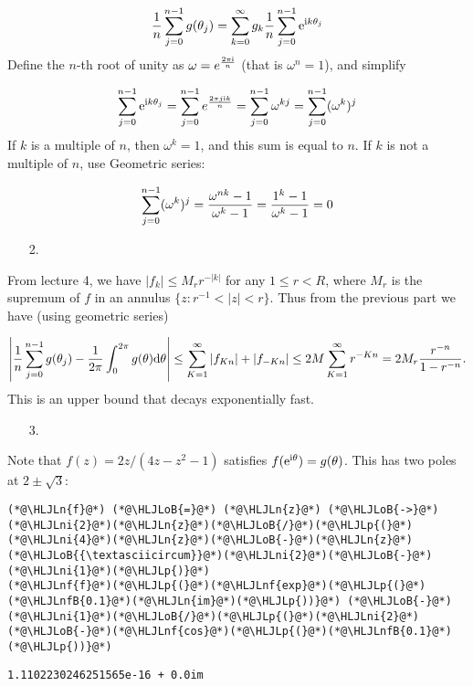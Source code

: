 \documentclass[12pt,a4paper]{article}
\newcommand{\HLJLn}[1]{#1}
\newcommand{\HLJLnf}[1]{\textcolor[RGB]{66,102,213}{#1}}
\newcommand{\HLJLnfB}[1]{\textcolor[RGB]{59,151,46}{#1}}
\newcommand{\HLJLni}[1]{\textcolor[RGB]{59,151,46}{#1}}
\newcommand{\HLJLoB}[1]{\textcolor[RGB]{102,102,102}{\textbf{#1}}}
\newcommand{\HLJLp}[1]{#1}
\def\D{ {\rm d} }
\def\I{ {\rm i} }
\def\E{ {\rm e} }
\begin{document}
\[
{1 \over n} \sum_{j=0}^{n-1} g(\theta_j) = \sum_{k=0}^\infty g_k  {1 \over n} \sum_{j=0}^{n-1} \E^{\I k \theta_j}
\]
Define the $n$-th root of unity as $\omega = e^{2 \pi \I  \over n}$ (that is $\omega^n = 1$), and simplify

\[
\sum_{j=0}^{n-1} \E^{\I k \theta_j} =\sum_{j=0}^{n-1} e^{{2 \pi j \I k \over n}} =\sum_{j=0}^{n-1} \omega^{kj}= \sum_{j=0}^{n-1} (\omega^k)^j
\]
If $k$ is a multiple of $n$, then $\omega^k = 1$, and this sum is equal to $n$. If $k$ is not a multiple of $n$, use Geometric series:

\[
\sum_{j=0}^{n-1} (\omega^k)^j = {\omega^{nk} - 1 \over \omega^k -1} = {1^k - 1 \over \omega^k-1} = 0
\]
\begin{itemize}
\item[2. ] \end{itemize}
From lecture 4, we have $|f_k| \leq M_r r^{-|k|}$ for any $1 \leq r < R$, where $M_r$ is the supremum of $f$ in an annulus $\{ z : r^{-1} < |z| < r \}$. Thus from the previous part we have (using geometric series)

\[
\left| {1 \over n} \sum_{j=0}^{n-1} g(\theta_j)  - { 1\over 2 \pi}	 \int_0^{2\pi} g(\theta) \D \theta \right| \leq \sum_{K=1}^\infty |f_{Kn}| + |f_{-Kn}| \leq 2M \sum_{K=1}^\infty r^{-Kn} = 2M_r {r^{-n} \over 1 - r^{-n}}.
\]
This is an upper bound that  decays exponentially fast.

\begin{itemize}
\item[3. ] \end{itemize}
Note that $f(z) = 2 z/(4z - z^2 - 1)$ satisfies $f(\E^{\I \theta}) = g(\theta)$. This has two poles at $2 \pm \sqrt 3$:


\begin{lstlisting}
(*@\HLJLn{f}@*) (*@\HLJLoB{=}@*) (*@\HLJLn{z}@*) (*@\HLJLoB{->}@*) (*@\HLJLni{2}@*)(*@\HLJLn{z}@*)(*@\HLJLoB{/}@*)(*@\HLJLp{(}@*)(*@\HLJLni{4}@*)(*@\HLJLn{z}@*)(*@\HLJLoB{-}@*)(*@\HLJLn{z}@*)(*@\HLJLoB{{\textasciicircum}}@*)(*@\HLJLni{2}@*)(*@\HLJLoB{-}@*)(*@\HLJLni{1}@*)(*@\HLJLp{)}@*)
(*@\HLJLnf{f}@*)(*@\HLJLp{(}@*)(*@\HLJLnf{exp}@*)(*@\HLJLp{(}@*)(*@\HLJLnfB{0.1}@*)(*@\HLJLn{im}@*)(*@\HLJLp{))}@*) (*@\HLJLoB{-}@*) (*@\HLJLni{1}@*)(*@\HLJLoB{/}@*)(*@\HLJLp{(}@*)(*@\HLJLni{2}@*)(*@\HLJLoB{-}@*)(*@\HLJLnf{cos}@*)(*@\HLJLp{(}@*)(*@\HLJLnfB{0.1}@*)(*@\HLJLp{))}@*)
\end{lstlisting}

\begin{lstlisting}
1.1102230246251565e-16 + 0.0im
\end{lstlisting}
\end{document}
